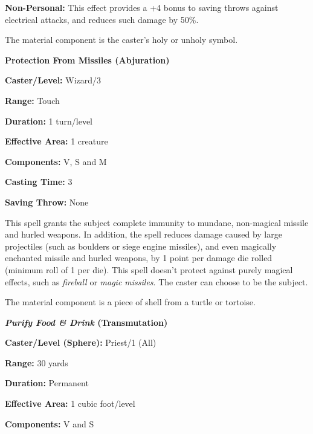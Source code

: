 \begin{multicols}{2}
\textbf{Non-Personal:} This effect provides a +4 bonus to saving throws against electrical attacks, and reduces such damage by 50\%.  

The material component is the caster's holy or unholy symbol.

\vspace{1em}

\noindent
\begin{minipage}{\columnwidth}

\noindent \textbf{Protection From Missiles (Abjuration)}

\noindent \textbf{Caster/Level:} Wizard/3

\noindent \textbf{Range:} Touch

\noindent \textbf{Duration:} 1 turn/level

\noindent \textbf{Effective Area:} 1 creature

\noindent \textbf{Components:} V, S and M

\noindent \textbf{Casting Time:} 3

\noindent \textbf{Saving Throw:} None

\end{minipage}

This spell grants the subject complete immunity to mundane, non-magical missile and hurled weapons.  In addition, the spell reduces damage caused by large projectiles (such as boulders or siege engine missiles), and even magically enchanted missile and hurled weapons, by 1 point per damage die rolled (minimum roll of 1 per die).  This spell doesn't protect against purely magical effects, such as \textit{fireball} or \textit{magic missiles}.  The caster can choose to be the subject.

The material component is a piece of shell from a turtle or tortoise.

\vspace{1em}

\noindent
\begin{minipage}{\columnwidth}

\noindent \textbf{\textit{Purify Food \& Drink} (Transmutation)}

\noindent \textbf{Caster/Level (Sphere):} Priest/1 (All)

\noindent \textbf{Range:} 30 yards

\noindent \textbf{Duration:} Permanent

\noindent \textbf{Effective Area:} 1 cubic foot/level

\noindent \textbf{Components:} V and S


\end{minipage}
\end{multicols}
